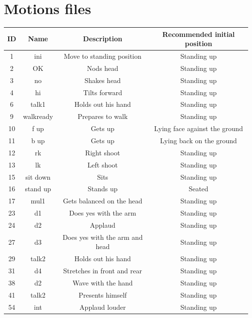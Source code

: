 \documentclass[a4paper, 12pt]{article}  		%
\begin{document}

\section{Motions files} \label{sec:Motions}

\begin{table}[H]
\begin{center}
\begin{tabular}{ | c | c | c | c | }

\hline
ID & Name & Description & Recommended initial position \\ 
\hline
\hline
1 & ini & Move to standing position & Standing up \\
\hline
2 & OK & Nods head & Standing up \\
\hline
3 & no & Shakes head & Standing up \\
\hline
4 & hi & Tilts forward & Standing up \\
\hline
6 & talk1 & Holds out his hand & Standing up \\
\hline
9 & walkready & Prepares to walk & Standing up \\
\hline
10 & f up & Gets up & Lying face against the ground \\
\hline
11 & b up & Gets up & Lying back on the ground \\
\hline
12 & rk & Right shoot & Standing up \\
\hline
13 & lk & Left shoot & Standing up \\
\hline
15 & sit down & Sits & Standing up \\
\hline
16 & stand up & Stands up & Seated \\
\hline
17 & mul1 & Gets balanced on the head & Standing up \\
\hline
23 & d1 & Does yes with the arm & Standing up \\
\hline
24 & d2 & Applaud & Standing up \\
\hline
27 & d3 & Does yes with the arm and head & Standing up \\
\hline
29 & talk2 & Holds out his hand & Standing up \\
\hline
31 & d4 & Stretches in front and rear & Standing up \\
\hline
38 & d2 & Wave with the hand & Standing up \\
\hline
41 & talk2 & Presents himself & Standing up \\
\hline
54 & int & Applaud louder & Standing up \\

\end{tabular}
\end{center}
\end{table}
\end{document}

